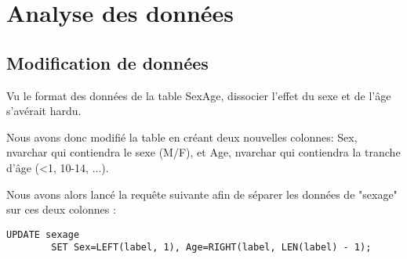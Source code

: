\chapter{Analyse des données}


\section{Modification de données}

    Vu le format des données de la table SexAge, dissocier l'effet du sexe et de l'âge s'avérait hardu.

    Nous avons donc modifié la table en créant deux nouvelles colonnes: Sex, nvarchar qui contiendra le sexe (M/F), et Age,
    nvarchar qui contiendra la tranche d'âge (<1, 10-14, ...).

    Nous avons alors lancé la requête suivante afin de séparer les données de "sexage" sur ces deux colonnes :

    \begin{lstlisting}[frame=single]
        UPDATE sexage
        SET Sex=LEFT(label, 1), Age=RIGHT(label, LEN(label) - 1);
    \end{lstlisting}